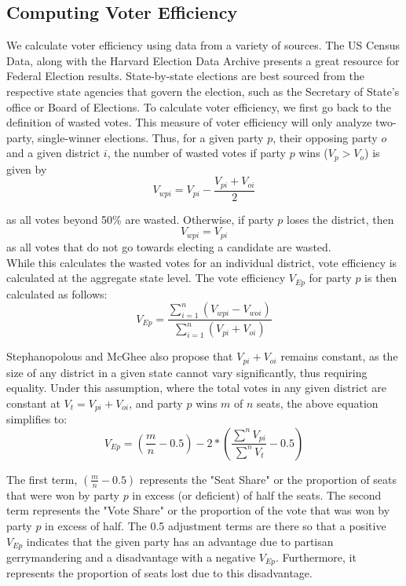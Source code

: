 \documentclass[12pt]{article}
\begin{document}
  \subsection {Computing Voter Efficiency}
  We calculate voter efficiency using data from a variety of sources.  The US Census Data, along with the Harvard Election Data Archive presents a great resource for Federal Election results.  State-by-state elections are best sourced from the respective state agencies that govern the election, such as the Secretary of State's office or Board of Elections.  To calculate voter efficiency, we first go back to the definition of wasted votes.  This measure of voter efficiency will only analyze two-party, single-winner elections.  Thus, for a given party $p$, their opposing party $o$ and a given district $i$, the number of wasted votes  if party $p$ wins ($V_{p} > V_{o}$)  is given by 
    \[ V_{wpi} = V_{pi} - \frac{V_{pi}+V_{oi}}{2}\]
    
    as all votes beyond 50\% are wasted. Otherwise, if party $p$ loses the district, then
    \[V_{wpi} = V_{pi}\]
    as all votes that do not go towards electing a candidate are wasted.\\
    
    While this calculates the wasted votes for an individual district, vote efficiency is calculated at the aggregate state level.  The vote efficiency $V_{Ep}$ for party $p$ is then calculated as follows:
     \[V_{Ep} = \frac{\sum_{i=1}^{n}(V_{wpi}-V_{woi})}{\sum_{i=1}^{n}(V_{pi}+V_{oi})}\]
     
     Stephanopolous and McGhee also propose that $V_{pi}+V_{oi}$ remains constant, as the size of any district in a given state cannot vary significantly, thus requiring equality.  Under this assumption, where the total votes in any given district are constant at $V_{t} = V_{pi}+V_{oi}$, and party $p$ wins $m$ of $n$ seats, the above equation simplifies to:
     \[V_{Ep} = (\frac{m}{n}-0.5) - 2*(\frac{\sum^{n}V_{pi}}{\sum^n{V_t}}-0.5)\]
  
  The first term, $(\frac{m}{n}-0.5)$ represents the "Seat Share" or the proportion of seats that were won by party $p$ in excess (or deficient) of half the seats.  The second term represents the "Vote Share" or the proportion of the vote that was won by party $p$ in excess of half. The 0.5 adjustment terms are there so that a positive $V_{Ep}$ indicates that the given party has an advantage due to partisan gerrymandering and a disadvantage with a negative $V_{Ep}$.  Furthermore, it represents the proportion of seats lost due to this disadvantage.\\
  
\end{document}
